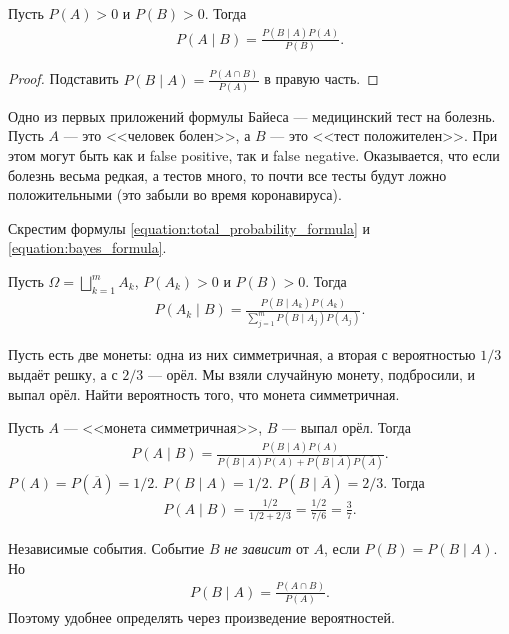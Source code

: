 \begin{prop}
 Пусть $P(A) > 0$ и  $P(B) > 0$. Тогда
 \begin{align}
  \label{equation:bayes_formula}
  P(A \mid B) = \frac{P(B \mid A)P(A)}{P(B)}.
 \end{align} 
\end{prop}
\begin{proof} Подставить $ P(B \mid A) = \frac{P(A \cap B)}{P(A)} $ в правую часть.
\end{proof}
\begin{exmpl*}
 Одно из первых приложений формулы Байеса --- медицинский тест на болезнь. Пусть $A$ --- это <<человек болен>>, а $B$ --- это <<тест положителен>>. При этом могут быть как и false positive, так и false negative. Оказывается, что если болезнь весьма редкая, а тестов много, то почти все тесты будут ложно положительными (это забыли во время коронавируса).
\end{exmpl*}

Скрестим формулы \eqref{equation:total_probability_formula} и \eqref{equation:bayes_formula}.

\begin{thm}[Байеса]
 Пусть $\Omega = \bigsqcup_{k=1}^{m} A_k$, $P(A_k) > 0$ и $P(B) > 0$. Тогда
 \begin{align*}
  P(A_k \mid B) = \frac{P(B \mid A_k)P(A_k)}{\sum_{j=1}^{m} P(B \mid A_j)P(A_j)}
 .\end{align*} 
\end{thm}

\begin{exmpl*}
 Пусть есть две монеты: одна из них симметричная, а вторая с вероятностью $1 / 3$ выдаёт решку, а с $2 / 3$ --- орёл. Мы взяли случайную монету, подбросили, и выпал орёл. Найти вероятность того, что монета симметричная.

 Пусть $A$ --- <<монета симметричная>>, $B$ --- выпал орёл. Тогда
 \begin{align*}
  P(A \mid B) = \frac{P(B\mid A)P(A)}{P(B \mid A)P(A) + P(B \mid \overline A) P(\overline A)}
 .\end{align*} $P(A) = P(\overline A) = 1 / 2$.  $P(B \mid A) = 1 / 2$.  $P(B \mid \overline A) = 2 / 3$. Тогда
 \begin{align*}
  P(A \mid B) = \frac{1 / 2}{1 / 2 + 2 / 3} = \frac{1 / 2}{7 / 6} = \frac{3}{7}
 .\end{align*} 

\end{exmpl*}

Независимые события. Событие $B$ \textit{не зависит} от $A$, если $P(B) = P(B \mid A)$. Но
\begin{align*}
 P(B \mid A) = \frac{P(A\cap B)}{P(A)}
.\end{align*} Поэтому удобнее определять через произведение вероятностей.

